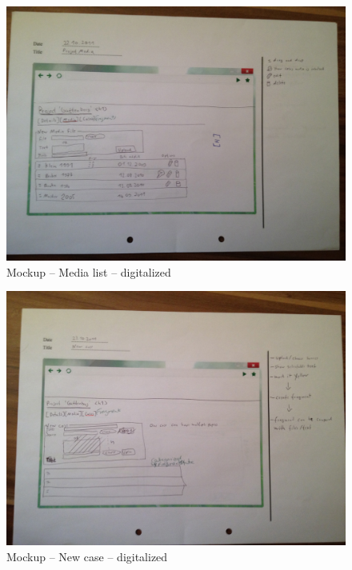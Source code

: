 \begin{appendix}
\begin{figure}[!h]
  \centering
    \includegraphics[width=\textwidth]{mockups/m_media_list.jpg}
  \caption{Mockup – Media list – digitalized }
  \label{fig:mMediaListMockup}
\end{figure}

\begin{figure}[!h]
  \centering
    \includegraphics[width=\textwidth]{mockups/m_new_case.jpg}
  \caption{Mockup – New case – digitalized }
  \label{fig:1newCaseMockup}
\end{figure}


\end{appendix}
